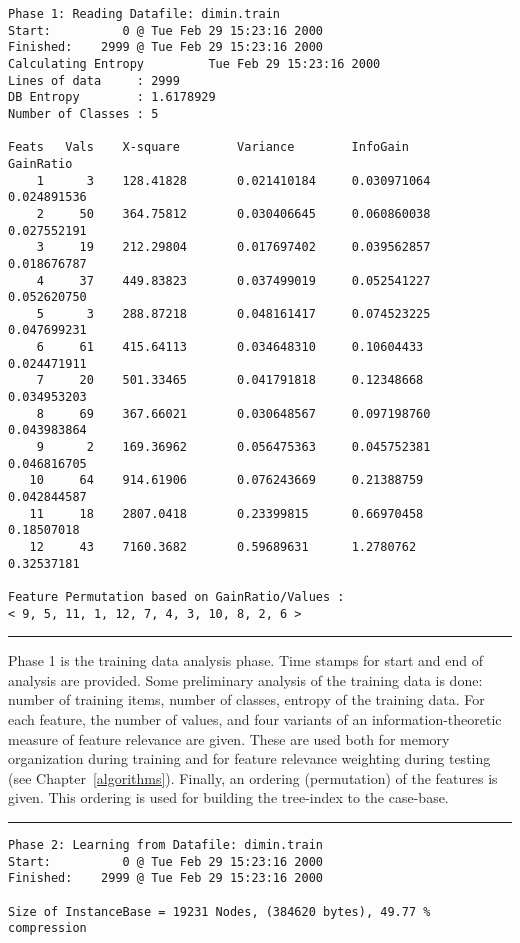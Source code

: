 \documentclass{report}
\begin{document}
{\small
\begin{verbatim}
Phase 1: Reading Datafile: dimin.train
Start:          0 @ Tue Feb 29 15:23:16 2000
Finished:    2999 @ Tue Feb 29 15:23:16 2000
Calculating Entropy         Tue Feb 29 15:23:16 2000
Lines of data     : 2999
DB Entropy        : 1.6178929
Number of Classes : 5
 
Feats   Vals    X-square        Variance        InfoGain        GainRatio
    1      3    128.41828       0.021410184     0.030971064     0.024891536
    2     50    364.75812       0.030406645     0.060860038     0.027552191
    3     19    212.29804       0.017697402     0.039562857     0.018676787
    4     37    449.83823       0.037499019     0.052541227     0.052620750
    5      3    288.87218       0.048161417     0.074523225     0.047699231
    6     61    415.64113       0.034648310     0.10604433      0.024471911
    7     20    501.33465       0.041791818     0.12348668      0.034953203
    8     69    367.66021       0.030648567     0.097198760     0.043983864
    9      2    169.36962       0.056475363     0.045752381     0.046816705
   10     64    914.61906       0.076243669     0.21388759      0.042844587
   11     18    2807.0418       0.23399815      0.66970458      0.18507018
   12     43    7160.3682       0.59689631      1.2780762       0.32537181
 
Feature Permutation based on GainRatio/Values :
< 9, 5, 11, 1, 12, 7, 4, 3, 10, 8, 2, 6 >                  
\end{verbatim}
}

\rule{\textwidth}{0.5mm}

\vspace{1cm}

Phase 1 is the training data analysis phase. Time stamps for start and
end of analysis are provided. Some preliminary analysis of the
training data is done: number of training items, number of classes,
entropy of the training data. For each feature, the number of values,
and four variants of an information-theoretic measure of feature
relevance are given. These are used both for memory organization
during training and for feature relevance weighting during testing
(see Chapter~\ref{algorithms}). Finally, an ordering (permutation) of
the features is given. This ordering is used for building the
tree-index to the case-base.

\vspace{1cm}

\rule{\textwidth}{0.5mm}


{\small
\begin{verbatim}
Phase 2: Learning from Datafile: dimin.train
Start:          0 @ Tue Feb 29 15:23:16 2000
Finished:    2999 @ Tue Feb 29 15:23:16 2000
 
Size of InstanceBase = 19231 Nodes, (384620 bytes), 49.77 % compression           
\end{verbatim}
}
\end{document}
